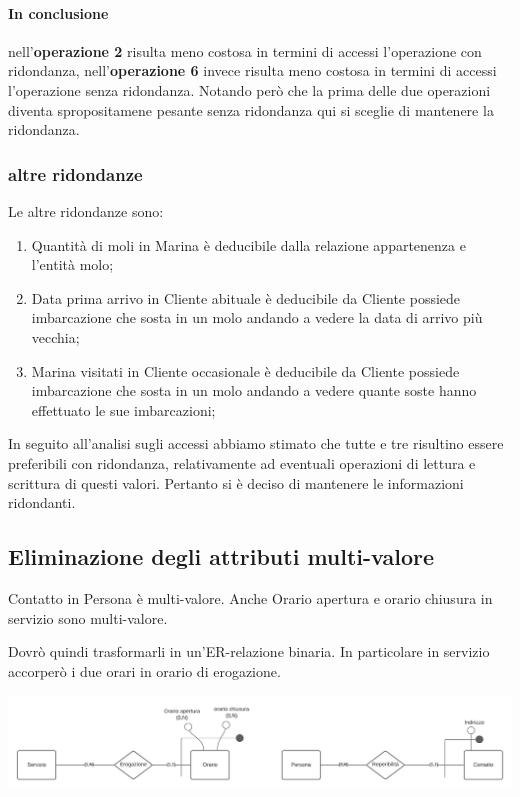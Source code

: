 \paragraph{In conclusione}
nell'\textbf{operazione 2} risulta meno costosa in termini di accessi l'operazione con ridondanza, nell'\textbf{operazione 6} invece risulta meno costosa in termini di accessi l'operazione senza ridondanza. Notando però che la prima delle due operazioni diventa spropositamene pesante senza ridondanza qui si sceglie di mantenere la ridondanza.

\subsubsection{altre ridondanze}

Le altre ridondanze sono:
\begin{enumerate}
    \item Quantità di moli in Marina è deducibile dalla relazione appartenenza e l'entità molo;
    \item Data prima arrivo in Cliente abituale è deducibile da Cliente possiede imbarcazione che sosta in un molo andando a vedere la data di arrivo più vecchia;
    \item Marina visitati in Cliente occasionale è deducibile da Cliente possiede imbarcazione che sosta in un molo andando a vedere quante soste hanno effettuato le sue imbarcazioni;
\end{enumerate}

In seguito all'analisi sugli accessi abbiamo stimato che tutte e tre risultino essere preferibili con ridondanza, relativamente ad eventuali operazioni di lettura e scrittura di questi valori. Pertanto si è deciso di mantenere le informazioni ridondanti.


\subsection{Eliminazione degli attributi multi-valore}

Contatto in Persona è multi-valore. Anche Orario apertura e orario chiusura in servizio sono multi-valore.

Dovrò quindi trasformarli in un'ER-relazione binaria. In particolare in servizio accorperò i due orari in orario di erogazione.

\includegraphics[width=\linewidth]{img/multi_valore.png}

